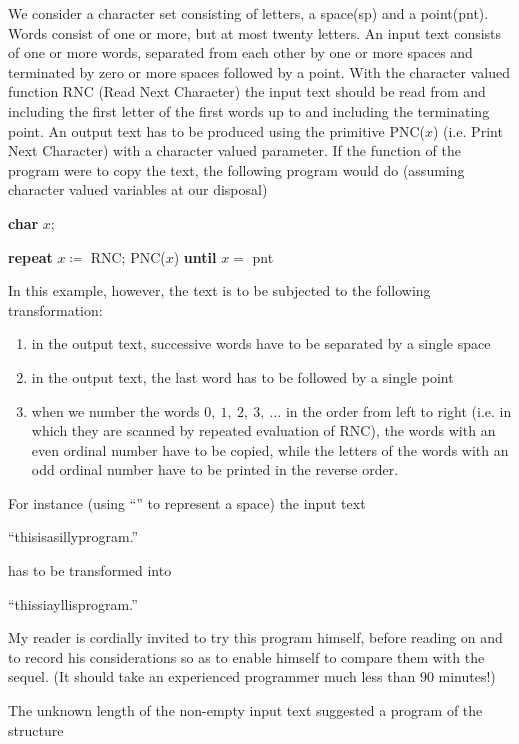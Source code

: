 We consider a character set consisting of letters, a space(sp) and a point(pnt). Words consist of one or more, but at most twenty letters. An input text consists of one or more words, separated from each other by one or more spaces and terminated by zero or more spaces followed by a point. With the character valued function RNC (Read Next Character) the input text should be read from and including the first letter of the first words up to and including the terminating point. An output text has to be produced using the primitive PNC($x$) (i.e. Print Next Character) with a character valued parameter. If the function of the program were to copy the text, the following program would do (assuming character valued variables at our disposal)

\quad \textbf{char} $x$;

\quad \textbf{repeat} $x \coloneq$ RNC; PNC($x$) \textbf{until} $x =$ pnt

In this example, however, the text is to be subjected to the following transformation:

\begin{enumerate}[wide, nosep, label=(\arabic*)]
	\item in the output text, successive words have to be separated by a single space
	\item in the output text, the last word has to be followed by a single point
	\item when we number the words $0,\ 1,\ 2,\ 3,\ \dots$ in the order from left to right (i.e. in which they are scanned by repeated evaluation of RNC), the words with an even ordinal number have to be copied, while the letters of the words with an odd ordinal number have to be printed in the reverse order.
\end{enumerate}

For instance (using ``\textendash'' to represent a space) the input text

\quad ``this\textemdash{}is\textemdash{}a\textemdash{}silly\textemdash{}program\textemdash{}.''

\noindent
has to be transformed into

\quad ``this\textendash si\textendash a\textendash yllis\textendash program.''

My reader is cordially invited to try this program himself, before reading on and to record his considerations so as to enable himself to compare them with the sequel. (It should take an experienced programmer much less than 90 minutes!)

The unknown length of the non-empty input text suggested a program of the structure

